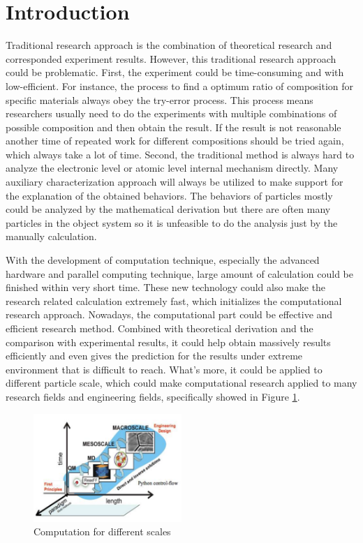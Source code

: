 \documentclass[letterpaper,12pt]{article}
\begin{document}
\section{Introduction}
\par Traditional research approach is the combination of theoretical research and corresponded experiment results. However, this traditional research approach could be problematic. First, the experiment could be time-consuming and with low-efficient. For instance, the process to find a optimum ratio of composition for specific materials always obey the try-error process. This process means researchers usually need to do the experiments with multiple combinations of possible composition and then obtain the result. If the result is not reasonable another time of repeated work for different compositions should be tried again, which always take a lot of time. Second, the traditional method is always hard to analyze the electronic level or atomic level internal mechanism directly. Many auxiliary characterization approach will always be utilized to make support for the explanation of the obtained behaviors. The behaviors of particles mostly could be analyzed by the mathematical derivation but there are often many particles in the object system so it is unfeasible to do the analysis just by the manually calculation.\\
\par With the development of computation technique, especially the advanced hardware and parallel computing technique, large amount of calculation could be finished within very short time. These new technology could also make the research related calculation extremely fast, which initializes the computational research approach\cite{lee2016computational}. Nowadays, the computational part could be effective and efficient research method. Combined with theoretical derivation and the comparison with experimental results, it could help obtain massively results efficiently and even gives the prediction for the results under extreme environment that is difficult to reach. What's more, it could be applied to different particle scale, which could make computational research applied to many research fields and engineering fields, specifically showed in Figure \ref{scales}.

\begin{figure}[ht]
\centering
\includegraphics[width=0.5\textwidth]{./images/DifferentScales}
\caption{\label{scales}Computation for different scales\cite{luintroduction}}
\end{figure}
\end{document}
